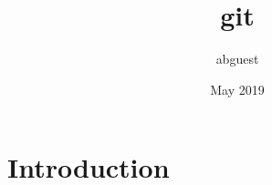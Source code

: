 \documentclass{article}
\title{git}
\author{abguest }
\date{May 2019}
\begin{document}
\maketitle

\section{Introduction}
\end{document}
